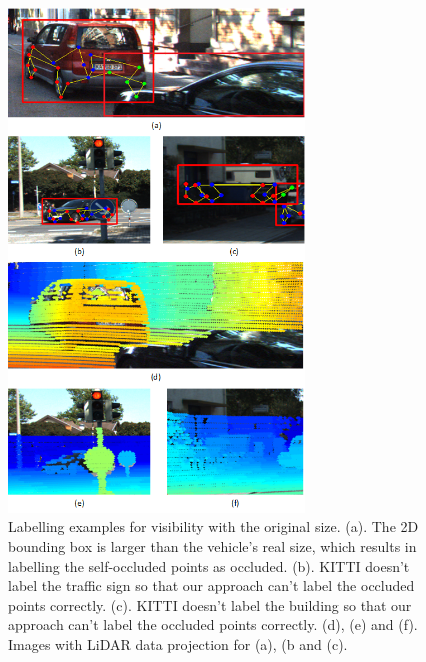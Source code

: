 \documentclass[a4paper,12pt]{article}
\begin{document}
\begin{figure}[H]		
	\includegraphics[width=0.7\textwidth]{visib_def.png}
	\caption[Labelling examples for visibility with the original size.]{Labelling examples for visibility with the original size. (a). The 2D bounding box is larger than the vehicle's real size, which results in labelling the self-occluded points as occluded. (b). KITTI doesn't label the traffic sign so that our approach can't label the occluded points correctly. (c). KITTI doesn't label the building so that our approach can't label the occluded points correctly. (d), (e) and (f).  Images with LiDAR data projection for (a), (b and (c).}
	\centering
	\label{figure:visib_def}
\end{figure}

\end{document}
